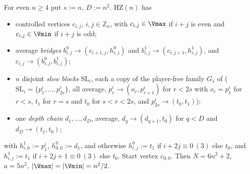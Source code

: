 \begin{definition}\label{hz:ring}
For even $n\ge4$ put $s:=n$, $D:=n^{2}$. $\mathrm{HZ}(n)$ has
\begin{itemize}[leftmargin=1.6em]
\item controlled vertices $c_{i,j}$, $i,j\in\mathbb Z_n$, with $c_{i,j}\in\Vmax$
      if $i+j$ is even and $c_{i,j}\in\Vmin$ if $i+j$ is odd;
\item average \emph{bridges} $b^{0}_{i,j}\to(c_{i+1,j},h^{0}_{i,j})$ and
      $b^{1}_{i,j}\to(c_{i,j+1},h^{1}_{i,j})$, and
      $c_{i,j}\to(b^{0}_{i,j},b^{1}_{i,j})$;
\item $n$ disjoint \emph{slow blocks} $\mathrm{SL}_i$, each a copy of the
      player-free family $G_s$ of 
      ($\mathrm{SL}_i=\{p^{i}_1,\dots,p^{i}_{2s}\}$, all average,
      $p^{i}_r\to(o_r,p^{i}_{r+1})$ for $r<2s$ with $o_r=p^{i}_1$ for $r<s$,
      $t_1$ for $r=s$ and $t_0$ for $s<r<2s$, and $p^{i}_{2s}\to(t_0,t_1)$);
\item one \emph{depth chain} $d_1,\dots,d_D$, average, $d_q\to(d_{q+1},t_0)$
      for $q<D$ and $d_D\to(t_1,t_0)$;
\end{itemize}
with $h^{1}_{i,0}:=p^{i}_1$, $h^{0}_{0,0}:=d_1$, and otherwise
$h^{0}_{i,j}:=t_1$ if $i+2j\equiv0\ (3)$ else $t_0$, and
$h^{1}_{i,j}:=t_1$ if $i+2j+1\equiv0\ (3)$ else $t_0$. Start vertex $c_{0,0}$.
Then $N=6n^{2}+2$, $a=5n^{2}$, $|\Vmax|=|\Vmin|=n^{2}/2$.
\end{definition}

